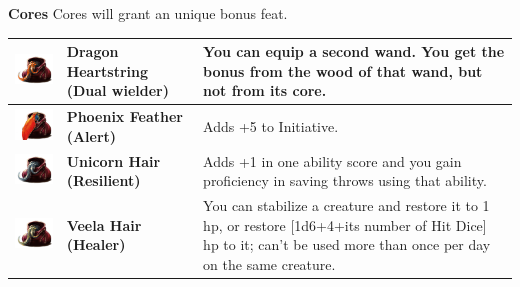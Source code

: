\textbf{Cores} Cores will grant an unique bonus feat. \\

\begin{tabular}{ m{4cm}m{3cm}m{6cm} } \hline
	\includegraphics[width=4cm]{../Pictures/Gameplay/Items/Wearables/Wand/Cores/Dragon_heartstring_icon.png} & \textbf{Dragon Heartstring (Dual wielder)} & You can equip a second wand. You get the bonus from the wood of that wand, but not from its core. \\ \hline
	\includegraphics[width=4cm]{../Pictures/Gameplay/Items/Wearables/Wand/Cores/Phoenix_feather_icon.png} & \textbf{Phoenix Feather (Alert)} & Adds +5 to Initiative. \\ \hline
	\includegraphics[width=4cm]{../Pictures/Gameplay/Items/Wearables/Wand/Cores/Unicorn_hair_icon.png} & \textbf{Unicorn Hair (Resilient)} & Adds +1 in one ability score and you gain proficiency in saving throws using that ability.  \\ \hline
	\includegraphics[width=4cm]{../Pictures/Gameplay/Items/Wearables/Wand/Cores/Veela_hair_icon.png} & \textbf{Veela Hair (Healer)} & You can stabilize a creature and restore it to 1 hp, or restore [1d6+4+its number of Hit Dice] hp to it; can't be used more than once per day on the same creature. \\ \hline

\end{tabular}
